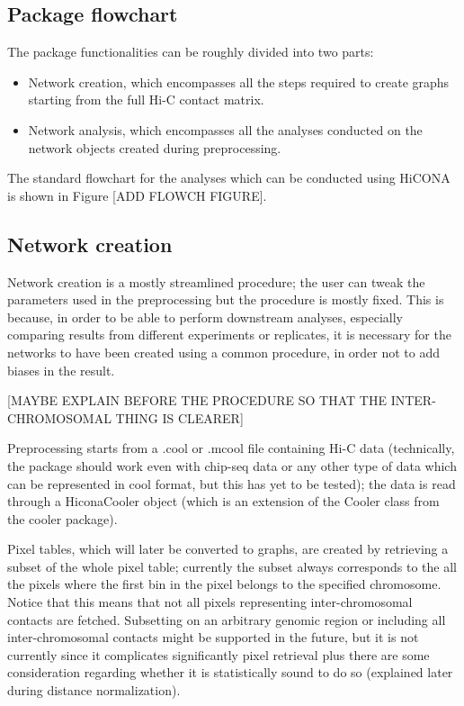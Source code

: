 \subsection{Package flowchart}
The package functionalities can be roughly divided into two parts:
\begin{itemize}\tightlist
  \item Network creation, which encompasses all the steps required to create graphs starting from the full Hi-C contact matrix.
  \item Network analysis, which encompasses all the analyses conducted on the network objects created during preprocessing.
\end{itemize} 
The standard flowchart for the analyses which can be conducted using HiCONA is shown in Figure [ADD FLOWCH FIGURE].

\subsection{Network creation} %
Network creation is a mostly streamlined procedure; the user can tweak the parameters used in the preprocessing but the procedure is mostly fixed. This is because, in order to be able to perform downstream analyses, especially comparing results from different experiments or replicates, it is necessary for the networks to have been created using a common procedure, in order not to add biases in the result.

[MAYBE EXPLAIN BEFORE THE PROCEDURE SO THAT THE INTER-CHROMOSOMAL THING IS CLEARER]

Preprocessing starts from a .cool or .mcool file containing Hi-C data (technically, the package should work even with chip-seq data or any other type of data which can be represented in cool format, but this has yet to be tested); the data is read through a HiconaCooler object (which is an extension of the Cooler class from the cooler package).

Pixel tables, which will later be converted to graphs, are created by retrieving a subset of the whole pixel table; currently the subset always corresponds to the all the pixels where the first bin in the pixel belongs to the specified chromosome. Notice that this means that not all pixels representing inter-chromosomal contacts are fetched. Subsetting on an arbitrary genomic region or including all inter-chromosomal contacts might be supported in the future, but it is not currently since it complicates significantly pixel retrieval plus there are some consideration regarding whether it is statistically sound to do so (explained later during distance normalization).

